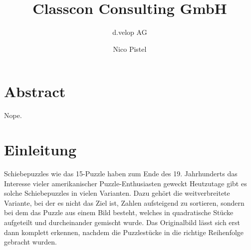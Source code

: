 \documentclass{whswinvcbook}
\title[Bericht]{Classcon Consulting GmbH}
\subtitle{d.velop AG}
\author[Nico Pistel]{Nico Pistel}
\begin{document}
\frontmatter

\maketitle

\cleardoublepage
\chapter*{Abstract}
Nope.

\tableofs
\lstlistoflistings
\listofalgorithms

\mainmatter

\chapter{Einleitung}
Schiebepuzzles wie das 15-Puzzle haben zum Ende des 19. Jahrhunderts das Interesse vieler amerikanischer Puzzle-Enthusiasten geweckt\cite{perelman,sloson} Heutzutage gibt es solche Schiebepuzzles in vielen Varianten. Dazu gehört die weitverbreitete Variante, bei der es nicht das Ziel ist, Zahlen aufsteigend zu sortieren, sondern bei dem das Puzzle aus einem Bild besteht, welches in quadratische Stücke aufgeteilt und durcheinander gemischt wurde. Das Originalbild lässt sich erst dann komplett erkennen, nachdem die Puzzlestücke in die richtige Reihenfolge gebracht wurden.
\end{document}
